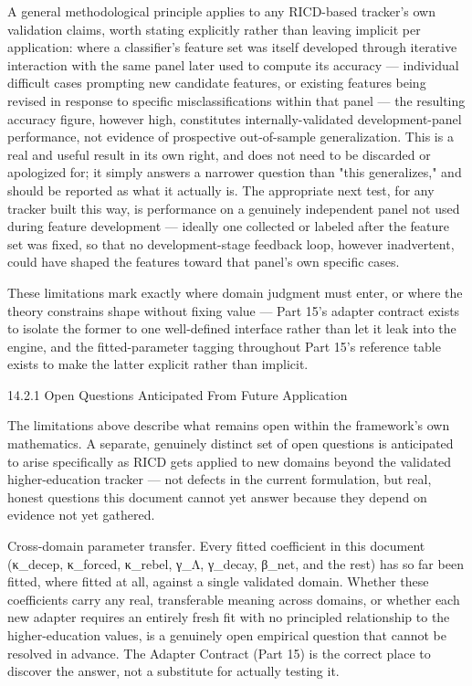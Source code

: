 \documentclass[
]{article}
\begin{document}
A general methodological principle applies to any RICD-based tracker's
own validation claims, worth stating explicitly rather than leaving
implicit per application: where a classifier's feature set was itself
developed through iterative interaction with the same panel later used
to compute its accuracy --- individual difficult cases prompting new
candidate features, or existing features being revised in response to
specific misclassifications within that panel --- the resulting accuracy
figure, however high, constitutes internally-validated development-panel
performance, not evidence of prospective out-of-sample generalization.
This is a real and useful result in its own right, and does not need to
be discarded or apologized for; it simply answers a narrower question
than "this generalizes," and should be reported as what it actually is.
The appropriate next test, for any tracker built this way, is
performance on a genuinely independent panel not used during feature
development --- ideally one collected or labeled after the feature set
was fixed, so that no development-stage feedback loop, however
inadvertent, could have shaped the features toward that panel's own
specific cases.

These limitations mark exactly where domain judgment must enter, or
where the theory constrains shape without fixing value --- Part 15's
adapter contract exists to isolate the former to one well-defined
interface rather than let it leak into the engine, and the
fitted-parameter tagging throughout Part 15's reference table exists to
make the latter explicit rather than implicit.

14.2.1 Open Questions Anticipated From Future Application

The limitations above describe what remains open within the framework's
own mathematics. A separate, genuinely distinct set of open questions is
anticipated to arise specifically as RICD gets applied to new domains
beyond the validated higher-education tracker --- not defects in the
current formulation, but real, honest questions this document cannot yet
answer because they depend on evidence not yet gathered.

Cross-domain parameter transfer. Every fitted coefficient in this
document (κ\_decep, κ\_forced, κ\_rebel, γ\_Λ, γ\_decay, β\_net, and the
rest) has so far been fitted, where fitted at all, against a single
validated domain. Whether these coefficients carry any real,
transferable meaning across domains, or whether each new adapter
requires an entirely fresh fit with no principled relationship to the
higher-education values, is a genuinely open empirical question that
cannot be resolved in advance. The Adapter Contract (Part 15) is the
correct place to discover the answer, not a substitute for actually
testing it.
\end{document}

